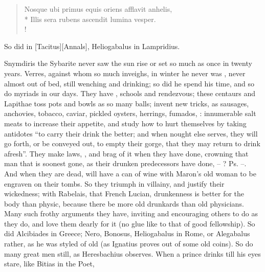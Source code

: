\begin{latin}
\begin{verse}%
Nosque ubi primus equis oriens afflavit anhelis,\\*
Illis sera rubens ascendit lumina vesper.\\!
\end{verse}%
\end{latin}

So did \Petronius in [Tacitus][Annals], Heliogabalus in Lampridius.


Snymdiris the Sybarite never saw the sun rise or set so much as once in twenty
years. Verres, against whom \Tully{} so much inveighs, in winter he never was
, never almost out of bed,
still wenching and drinking; so did he spend his time, and
so do myriads in our days. They have , schools and
rendezvous; these centaurs and Lapithae toss pots and bowls as so many balls;
invent new tricks, as sausages, anchovies, tobacco, caviar, pickled oysters,
herrings, fumados, \etc{}: innumerable salt meats to increase their appetite,
and study how to hurt themselves by taking antidotes \enquote{to
carry their drink the better; and when nought else serves,
they will go forth, or be conveyed out, to empty their gorge, that they may
return to drink afresh}. They make laws, , and brag of it when they have done, crowning
that man that is soonest gone, as their drunken predecessors have done, --
? Ps.  --. And when they are dead, will have a can of wine with
Maron's old woman to be engraven on their tombs. So they
triumph in villainy, and justify their wickedness; with Rabelais, that French
Lucian, drunkenness is better for the body than physic, because there be more
old drunkards than old physicians. Many such frothy arguments they have,
inviting and encouraging others to do as they do, and love
them dearly for it (no glue like to that of good fellowship). So did Alcibiades
in Greece; Nero, Bonosus, Heliogabalus in Rome, or Alegabalus rather, as he was
styled of old (as Ignatius proves out of some old coins).
So do many great men still, as Heresbachius observes. When
a prince drinks till his eyes stare, like Bitias in the Poet,

